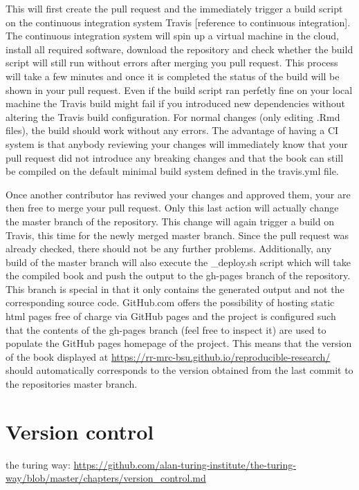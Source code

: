 \documentclass[]{book}
\begin{document}
This will first create the pull request and the immediately trigger a
build script on the continuous integration system Travis {[}reference to
continuous integration{]}. The continuous integration system will spin
up a virtual machine in the cloud, install all required software,
download the repository and check whether the build script will still
run without errors after merging you pull request. This process will
take a few minutes and once it is completed the status of the build will
be shown in your pull request. Even if the build script ran perfetly
fine on your local machine the Travis build might fail if you introduced
new dependencies without altering the Travis build configuration. For
normal changes (only editing .Rmd files), the build should work without
any errors. The advantage of having a CI system is that anybody
reviewing your changes will immediately know that your pull request did
not introduce any breaking changes and that the book can still be
compiled on the default minimal build system defined in the travis.yml
file.

Once another contributor has reviwed your changes and approved them,
your are then free to merge your pull request. Only this last action
will actually change the master branch of the repository. This change
will again trigger a build on Travis, this time for the newly merged
master branch. Since the pull request was already checked, there should
not be any further problems. Additionally, any build of the master
branch will also execute the \_deploy.sh script which will take the
compiled book and push the output to the gh-pages branch of the
repository. This branch is special in that it only contains the
generated output and not the corresponding source code. GitHub.com
offers the possibility of hosting static html pages free of charge via
GitHub pages and the project is configured such that the contents of the
gh-pages branch (feel free to inspect it) are used to populate the
GitHub pages homepage of the project. This means that the version of the
book displayed at
\url{https://rr-mrc-bsu.github.io/reproducible-research/} should
automatically corresponds to the version obtained from the last commit
to the repositories master branch.

\chapter{Version control}\label{chptr-version-control}

the turing way:
\url{https://github.com/alan-turing-institute/the-turing-way/blob/master/chapters/version_control.md}
\end{document}

